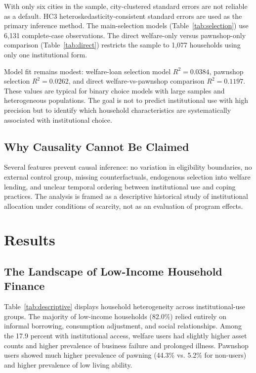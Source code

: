 \documentclass[12pt]{article}
\begin{document}
With only six cities in the sample, city-clustered standard errors are not reliable as a default. HC3 heteroskedasticity-consistent standard errors are used as the primary inference method. The main-selection models (Table~\ref{tab:selection}) use 6,131 complete-case observations. The direct welfare-only versus pawnshop-only comparison (Table~\ref{tab:direct}) restricts the sample to 1,077 households using only one institutional form.

Model fit remains modest: welfare-loan selection model $R^2 = 0.0384$, pawnshop selection $R^2 = 0.0262$, and direct welfare-vs-pawnshop comparison $R^2 = 0.1197$. These values are typical for binary choice models with large samples and heterogeneous populations. The goal is not to predict institutional use with high precision but to identify which household characteristics are systematically associated with institutional choice.

\subsection{Why Causality Cannot Be Claimed}

Several features prevent causal inference: no variation in eligibility boundaries, no external control group, missing counterfactuals, endogenous selection into welfare lending, and unclear temporal ordering between institutional use and coping practices. The analysis is framed as a descriptive historical study of institutional allocation under conditions of scarcity, not as an evaluation of program effects.

\newpage
\section{Results}

\subsection{The Landscape of Low-Income Household Finance}

Table~\ref{tab:descriptive} displays household heterogeneity across institutional-use groups. The majority of low-income households (82.0\%) relied entirely on informal borrowing, consumption adjustment, and social relationships. Among the 17.9 percent with institutional access, welfare users had slightly higher asset counts and higher prevalence of business failure and prolonged illness. Pawnshop users showed much higher prevalence of pawning (44.3\% vs. 5.2\% for non-users) and higher prevalence of low living ability.
\end{document}
